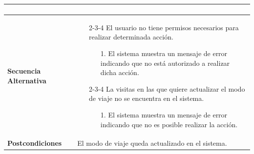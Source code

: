 \begin{longtable}{| p{4cm} | p{10cm} |}
\begin{enumerate}[leftmargin=0.7cm, topsep=0.1cm]
\end{enumerate}


\\
\hline
\textbf{Secuencia Alternativa} &\mbox{}\par\vspace{-\baselineskip}

\begin{enumerate}[leftmargin=0.9cm, topsep=0.1cm]
\item[2-3-4] El usuario no tiene permisos necesarios para realizar determinada acción.
	\begin{itemize}
	\item[1.] El sistema muestra un mensaje de error indicando que no está autorizado a realizar dicha acción.
	\end{itemize}
\item[2-3-4] La visitas en las que quiere actualizar el modo de viaje no se encuentra en el sistema.
	\begin{itemize}
	\item[1.] El sistema muestra un mensaje de error indicando que no es posible realizar la acción.
	\end{itemize}
\end{enumerate}

\\
\hline
\textbf{Postcondiciones} & 
El modo de viaje queda actualizado en el sistema.\\
\hline
\end{longtable}



\newpage
